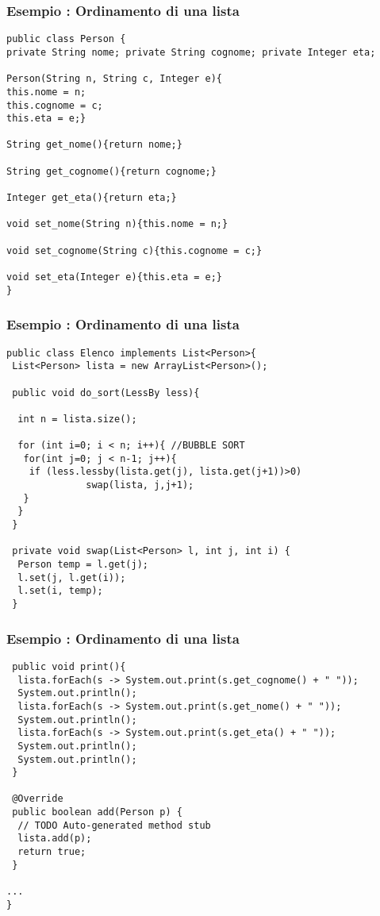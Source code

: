 \documentclass{beamer}
\begin{document}
\begin{frame}[fragile]
\frametitle{Esempio : Ordinamento di una lista}
\fontsize{12pt}{7.2}\selectfont
\begin{lstlisting}
public class Person {
private String nome; private String cognome; private Integer eta;

Person(String n, String c, Integer e){
this.nome = n;
this.cognome = c;
this.eta = e;}
	
String get_nome(){return nome;}
	
String get_cognome(){return cognome;}
	
Integer get_eta(){return eta;}
	
void set_nome(String n){this.nome = n;}
	
void set_cognome(String c){this.cognome = c;}
	
void set_eta(Integer e){this.eta = e;}
}
\end{lstlisting}
\end{frame}

\begin{frame}[fragile]
\frametitle{Esempio : Ordinamento di una lista}
\fontsize{12pt}{7.2}\selectfont
\begin{lstlisting}
public class Elenco implements List<Person>{
 List<Person> lista = new ArrayList<Person>();
	
 public void do_sort(LessBy less){
		
  int n = lista.size();
		
  for (int i=0; i < n; i++){ //BUBBLE SORT
   for(int j=0; j < n-1; j++){
    if (less.lessby(lista.get(j), lista.get(j+1))>0)
              swap(lista, j,j+1);
   }
  }		
 }
	
 private void swap(List<Person> l, int j, int i) {
  Person temp = l.get(j);
  l.set(j, l.get(i));
  l.set(i, temp);
 }
\end{lstlisting}
\end{frame}

\begin{frame}[fragile]
\frametitle{Esempio : Ordinamento di una lista}
\fontsize{12pt}{7.2}\selectfont
\begin{lstlisting}
 public void print(){
  lista.forEach(s -> System.out.print(s.get_cognome() + " "));
  System.out.println();
  lista.forEach(s -> System.out.print(s.get_nome() + " "));		
  System.out.println();		
  lista.forEach(s -> System.out.print(s.get_eta() + " "));		
  System.out.println();
  System.out.println();		
 }
	
 @Override
 public boolean add(Person p) {
  // TODO Auto-generated method stub
  lista.add(p);
  return true;
 }

...
}
\end{lstlisting}
\end{frame}
\end{document}
